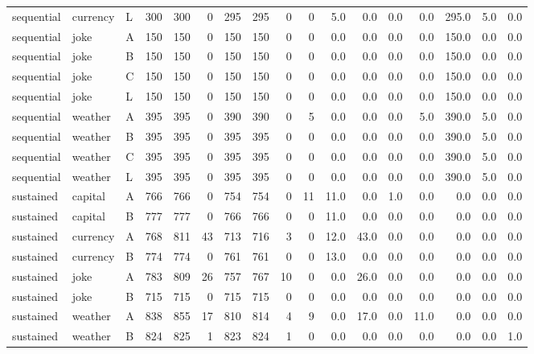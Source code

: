 \begin{tabular}{lllrrrrrrrrrrrrrr}
sequential & currency & L & 300 & 300 & 0 & 295 & 295 & 0 & 0 & 5.0 & 0.0 & 0.0 & 0.0 & 295.0 & 5.0 & 0.0 \\
sequential & joke & A & 150 & 150 & 0 & 150 & 150 & 0 & 0 & 0.0 & 0.0 & 0.0 & 0.0 & 150.0 & 0.0 & 0.0 \\
sequential & joke & B & 150 & 150 & 0 & 150 & 150 & 0 & 0 & 0.0 & 0.0 & 0.0 & 0.0 & 150.0 & 0.0 & 0.0 \\
sequential & joke & C & 150 & 150 & 0 & 150 & 150 & 0 & 0 & 0.0 & 0.0 & 0.0 & 0.0 & 150.0 & 0.0 & 0.0 \\
sequential & joke & L & 150 & 150 & 0 & 150 & 150 & 0 & 0 & 0.0 & 0.0 & 0.0 & 0.0 & 150.0 & 0.0 & 0.0 \\
sequential & weather & A & 395 & 395 & 0 & 390 & 390 & 0 & 5 & 0.0 & 0.0 & 0.0 & 5.0 & 390.0 & 5.0 & 0.0 \\
sequential & weather & B & 395 & 395 & 0 & 395 & 395 & 0 & 0 & 0.0 & 0.0 & 0.0 & 0.0 & 390.0 & 5.0 & 0.0 \\
sequential & weather & C & 395 & 395 & 0 & 395 & 395 & 0 & 0 & 0.0 & 0.0 & 0.0 & 0.0 & 390.0 & 5.0 & 0.0 \\
sequential & weather & L & 395 & 395 & 0 & 395 & 395 & 0 & 0 & 0.0 & 0.0 & 0.0 & 0.0 & 390.0 & 5.0 & 0.0 \\
sustained & capital & A & 766 & 766 & 0 & 754 & 754 & 0 & 11 & 11.0 & 0.0 & 1.0 & 0.0 & 0.0 & 0.0 & 0.0 \\
sustained & capital & B & 777 & 777 & 0 & 766 & 766 & 0 & 0 & 11.0 & 0.0 & 0.0 & 0.0 & 0.0 & 0.0 & 0.0 \\
sustained & currency & A & 768 & 811 & 43 & 713 & 716 & 3 & 0 & 12.0 & 43.0 & 0.0 & 0.0 & 0.0 & 0.0 & 0.0 \\
sustained & currency & B & 774 & 774 & 0 & 761 & 761 & 0 & 0 & 13.0 & 0.0 & 0.0 & 0.0 & 0.0 & 0.0 & 0.0 \\
sustained & joke & A & 783 & 809 & 26 & 757 & 767 & 10 & 0 & 0.0 & 26.0 & 0.0 & 0.0 & 0.0 & 0.0 & 0.0 \\
sustained & joke & B & 715 & 715 & 0 & 715 & 715 & 0 & 0 & 0.0 & 0.0 & 0.0 & 0.0 & 0.0 & 0.0 & 0.0 \\
sustained & weather & A & 838 & 855 & 17 & 810 & 814 & 4 & 9 & 0.0 & 17.0 & 0.0 & 11.0 & 0.0 & 0.0 & 0.0 \\
sustained & weather & B & 824 & 825 & 1 & 823 & 824 & 1 & 0 & 0.0 & 0.0 & 0.0 & 0.0 & 0.0 & 0.0 & 1.0 \\
\bottomrule
\end{tabular}
